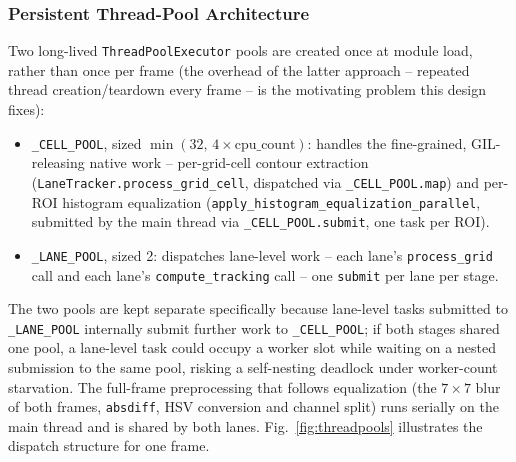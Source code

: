 \documentclass[conference]{IEEEtran}
\newcommand{\code}[1]{\texttt{#1}}
\begin{document}
\subsubsection{Persistent Thread-Pool Architecture}
\label{sec:pools}
Two long-lived \code{ThreadPoolExecutor} pools are created once at
module load, rather than once per frame (the overhead of the latter
approach -- repeated thread creation/teardown every frame -- is the
motivating problem this design fixes):

\begin{itemize}
\item \code{\_CELL\_POOL}, sized $\min(32,\,4\times\text{cpu\_count})$:
handles the fine-grained, GIL-releasing native work -- per-grid-cell
contour extraction (\code{LaneTracker.process\_grid\_cell}, dispatched
via \code{\_CELL\_POOL.map}) and per-ROI histogram equalization
(\code{apply\_histogram\_equalization\_parallel}, submitted by the main
thread via \code{\_CELL\_POOL.submit}, one task per ROI).
\item \code{\_LANE\_POOL}, sized 2: dispatches lane-level work -- each
lane's \code{process\_grid} call and each lane's
\code{compute\_tracking} call -- one \code{submit} per lane per stage.
\end{itemize}

The two pools are kept separate specifically because lane-level tasks
submitted to \code{\_LANE\_POOL} internally submit further work to
\code{\_CELL\_POOL}; if both stages shared one pool, a lane-level task
could occupy a worker slot while waiting on a nested submission to the
same pool, risking a self-nesting deadlock under worker-count
starvation. The full-frame preprocessing that follows equalization (the
$7\times7$ blur of both frames, \code{absdiff}, HSV conversion and channel
split) runs serially on the main thread and is shared by both lanes.
Fig.~\ref{fig:threadpools} illustrates the dispatch structure for one
frame.
\end{document}
